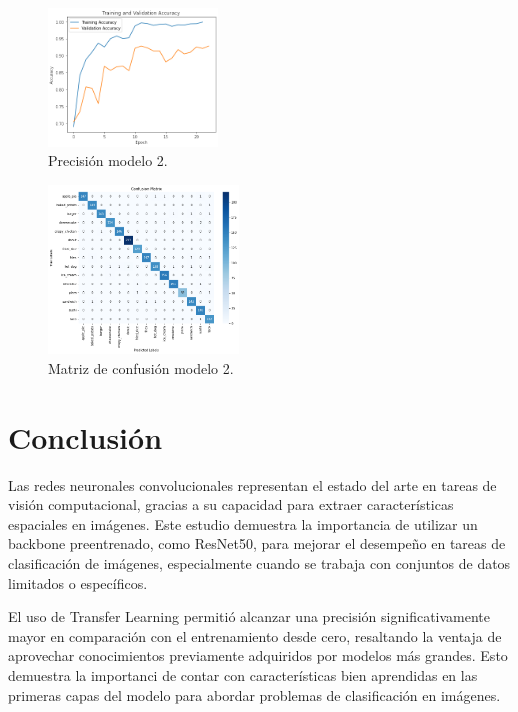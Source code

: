 \documentclass[twocolumn]{article}
\begin{document}
\begin{figure}[!ht]
\centering
\includegraphics[width=0.4\textwidth]{assets/trainmodel2acc.png}
\caption{Precisión modelo 2.}
\label{fig:train2acc}
\end{figure}
    
\begin{figure}[!ht]
\centering
\includegraphics[width=0.45\textwidth]{assets/confmodel2.png}
\caption{Matriz de confusión modelo 2.}
\label{fig:conf2}
\end{figure}


\section{Conclusión}
Las redes neuronales convolucionales representan el estado del arte en tareas de visión computacional, gracias a su capacidad para extraer características espaciales en imágenes. Este estudio demuestra la importancia de utilizar un backbone preentrenado, como ResNet50, para mejorar el desempeño en tareas de clasificación de imágenes, especialmente cuando se trabaja con conjuntos de datos limitados o específicos.

El uso de Transfer Learning permitió alcanzar una precisión significativamente mayor en comparación con el entrenamiento desde cero, resaltando la ventaja de aprovechar conocimientos previamente adquiridos por modelos más grandes. Esto demuestra la importanci de contar con características bien aprendidas en las primeras capas del modelo para abordar problemas de clasificación en imágenes.
\end{document}
